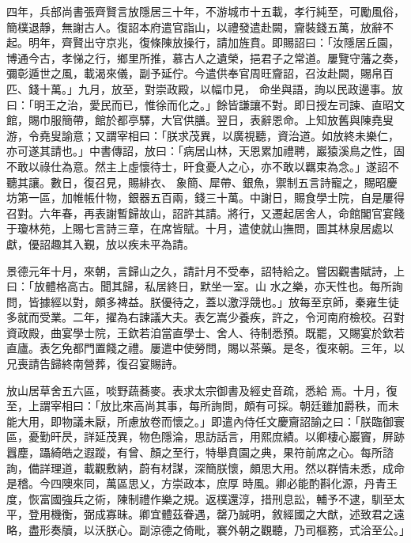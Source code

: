 \begin{pinyinscope}
 四年，兵部尚書張齊賢言放隱居三十年，不游城市十五載，孝行純至，可勵風俗，簡樸退靜，無謝古人。復詔本府遣官詣山，以禮發遣赴闕，齎裝錢五萬，放辭不起。明年，齊賢出守京兆，復條陳放操行，請加旌賁。即賜詔曰：「汝隱居丘園，博通今古，孝悌之行，鄉里所推，慕古人之遺榮，挹君子之常道。屢覽守藩之奏，彌彰遁世之風，載渴來儀，副予延佇。今遣供奉官周旺齎詔，召汝赴闕，賜帛百匹、錢十萬。」九月，放至，對崇政殿，以幅巾見，
 命坐與語，詢以民政邊事。放曰：「明王之治，愛民而已，惟徐而化之。」餘皆謙讓不對。即日授左司諫、直昭文館，賜巾服簡帶，館於都亭驛，大官供膳。翌日，表辭恩命。上知放舊與陳堯叟游，令堯叟諭意；又謂宰相曰：「朕求茂異，以廣視聽，資治道。如放終未樂仁，亦可遂其請也。」中書傳詔，放曰：「病居山林，天恩累加禮聘，巖猿溪鳥之性，固不敢以祿仕為意。然主上虛懷待士，旰食憂人之心，亦不敢以羈束為念。」遂詔不聽其讓。數日，復召見，賜緋衣、
 象簡、犀帶、銀魚，禦制五言詩寵之，賜昭慶坊第一區，加帷帳什物，銀器五百兩，錢三十萬。中謝日，賜食學士院，自是屢得召對。六年春，再表謝暫歸故山，詔許其請。將行，又遷起居舍人，命館閣官宴餞于瓊林苑，上賜七言詩三章，在席皆賦。十月，遣使就山撫問，圖其林泉居處以獻，優詔趣其入覲，放以疾未平為請。



 景德元年十月，來朝，言歸山之久，請計月不受奉，詔特給之。嘗因觀書賦詩，上曰：「放體格高古。聞其歸，私居終日，默坐一室。山
 水之樂，亦天性也。每所詢問，皆據經以對，頗多裨益。朕優待之，蓋以激浮競也。」放每至京師，秦雍生徒多就而受業。二年，擢為右諫議大夫。表乞嵩少養疾，許之，令河南府檢校。召對資政殿，曲宴學士院，王欽若洎當直學士、舍人、待制悉預。既罷，又賜宴於欽若直廬。表乞免都門置餞之禮。屢遣中使勞問，賜以茶藥。是冬，復來朝。三年，以兄喪請告歸終南營葬，復召宴賜詩。



 放山居草舍五六區，啖野蔬蕎麥。表求太宗御書及經史音疏，悉給
 焉。十月，復至，上謂宰相曰：「放比來高尚其事，每所詢問，頗有可採。朝廷雖加爵秩，而未能大用，即物議未厭，所慮放卷而懷之。」即遣內侍任文慶齎詔諭之曰：「朕臨御寰區，憂勤旰昃，詳延茂異，物色隱淪，思訪話言，用熙庶績。以卿棲心巖竇，屏跡囂塵，躡綺皓之遐蹤，有曾、顏之至行，特舉賁園之典，果符前席之心。每所諮詢，備詳理道，載觀敷納，蔚有材謀，深簡朕懷，頗思大用。然以群情未悉，成命是稽。今四隩來同，萬區思乂，方崇政本，庶厚
 時風。卿必能酌斟化源，丹青王度，恢富國強兵之術，陳制禮作樂之規。返樸還淳，措刑息訟，輔予不逮，馴至太平，登用機衡，弼成寡昧。卿宜體茲眷遇，罄乃誠明，敘經國之大猷，述致君之遠略，盡形奏牘，以沃朕心。副涼德之倚毗，褰外朝之觀聽，乃司樞務，式洽至公。」




\end{pinyinscope}
